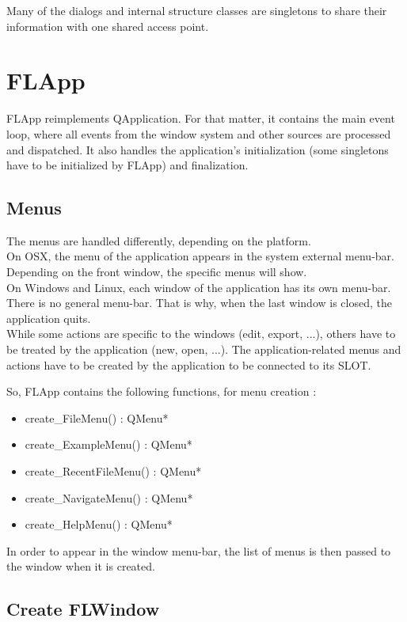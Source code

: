 \documentclass[a4paper]{article}
\begin{document}
Many of the dialogs and internal structure classes are singletons to share their information with one shared access point. 

\section{FLApp}
 
FLApp reimplements QApplication. For that matter, it contains the main event loop, where all events from the window system and other sources are processed and dispatched. It also handles the application's initialization (some singletons have to be initialized by FLApp) and finalization.

\subsection{Menus}

The menus are handled differently, depending on the platform. \\
On OSX, the menu of the application appears in the system external menu-bar. Depending on the front window, the specific menus will show. \\
On Windows and Linux, each window of the application has its own menu-bar. There is no general menu-bar. That is why, when the last window is closed, the application quits. \\

While some actions are specific to the windows (edit, export, ...), others have to be treated by the application (new, open, ...). The application-related menus and actions have to be created by the application to be connected to its SLOT. 

So, FLApp contains the following functions, for menu creation :
\begin{itemize}
\item create\_FileMenu() : QMenu* 
\item create\_ExampleMenu() : QMenu*
\item create\_RecentFileMenu() : QMenu*
\item create\_NavigateMenu() : QMenu*
\item create\_HelpMenu() : QMenu*
\end{itemize}

In order to appear in the window menu-bar, the list of menus is then passed to the window when it is created.

\subsection{Create FLWindow}
\end{document}
